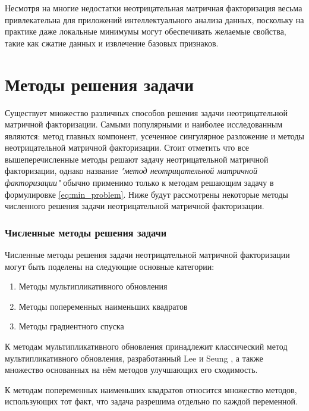 Несмотря на многие недостатки неотрицательная матричная факторизация весьма привлекательна для приложений интеллектуального анализа данных,
поскольку на практике даже локальные минимумы могут обеспечивать желаемые свойства, такие как сжатие данных и извлечение базовых признаков.





\newpage





\section{Методы решения задачи}

Существует множество различных способов решения задачи неотрицательной матричной факторизации.
Самыми популярными и наиболее исследованным являются: метод главных компонент, усеченное сингулярное разложение и методы неотрицательной матричной факторизации.
Стоит отметить что все вышеперечисленные методы решают задачу неотрицательной матричной факторизации,
однако название \textit{"метод неотрицательной матричной факторизации"} обычно применимо только к методам решающим задачу в формулировке \eqref{eq:min_problem}.
Ниже будут рассмотрены некоторые методы численного решения задачи неотрицательной матричной факторизации.

\subsubsection{Численные методы решения задачи}
Численные методы решения задачи неотрицательной матричной факторизации
могут быть поделены на следующие основные категории:
\begin{enumerate}
	\item Методы мультипликативного обновления
	\item Методы попеременных наименьших квадратов
	\item Методы градиентного спуска
\end{enumerate}

К методам мультипликативного обновления принадлежит классический метод мультипликативного обновления,
разработанный Lee и Seung \cite{lee_seung},
а также множество основанных на нём методов улучшающих его сходимость.

К методам попеременных наименьших квадратов относится множество методов,
использующих тот факт, что задача разрешима отдельно по каждой переменной.

